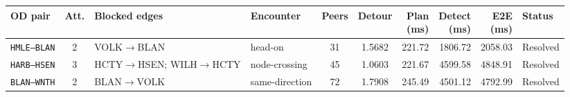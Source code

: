 \begin{tabular}{@{}p{1.35cm}cp{2.15cm}p{1.75cm}ccrrrp{1.3cm}@{}}
  \toprule
  OD pair & Att. & Blocked edges & Encounter & Peers & Detour & \makecell{Plan\\(ms)} & \makecell{Detect\\(ms)} & \makecell{E2E\\(ms)} & Status \\
  \midrule
  \texttt{HMLE--BLAN} & 2 & VOLK\(\to\)BLAN & head-on & 31 & 1.5682 & 221.72 & 1806.72 & 2058.03 & Resolved \\
  \texttt{HARB--HSEN} & 3 & HCTY\(\to\)HSEN; WILH\(\to\)HCTY & node-crossing & 45 & 1.0603 & 221.67 & 4599.58 & 4848.91 & Resolved \\
  \texttt{BLAN--WNTH} & 2 & BLAN\(\to\)VOLK & same-direction & 72 & 1.7908 & 245.49 & 4501.12 & 4792.99 & Resolved \\
  \bottomrule
\end{tabular}
